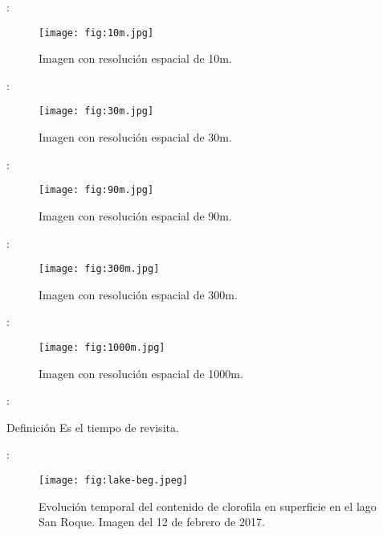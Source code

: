 \begin{frame}{\secname : \subsecname}
    \begin{figure}[h!]
        \centering
        \texttt{[image: fig:10m.jpg]}
        \caption{Imagen con resolución espacial de 10m.}
    \end{figure}
\end{frame}

\begin{frame}{\secname : \subsecname}
    \begin{figure}[h!]
        \centering
        \texttt{[image: fig:30m.jpg]}
        \caption{Imagen con resolución espacial de 30m.}
    \end{figure}
\end{frame}

\begin{frame}{\secname : \subsecname}
    \begin{figure}[h!]
        \centering
        \texttt{[image: fig:90m.jpg]}
        \caption{Imagen con resolución espacial de 90m.}
    \end{figure}
\end{frame}

\begin{frame}{\secname : \subsecname}
    \begin{figure}[h!]
        \centering
        \texttt{[image: fig:300m.jpg]}
        \caption{Imagen con resolución espacial de 300m.}
    \end{figure}
\end{frame}

\begin{frame}{\secname : \subsecname}
    \begin{figure}[h!]
        \centering
        \texttt{[image: fig:1000m.jpg]}
        \caption{Imagen con resolución espacial de 1000m.}
    \end{figure}
\end{frame}


\begin{frame}{\secname : \subsecname}
    \begin{block}{Definición}
        Es el tiempo de revisita.
    \end{block}
\end{frame}

\begin{frame}{\secname : \subsecname}
    \begin{figure}[h!]
        \centering
        \texttt{[image: fig:lake-beg.jpeg]}
        \caption{Evolución temporal del contenido de clorofila en superficie en el lago San Roque. Imagen del 12 de febrero de 2017.}
        \label{fig:lake-beg}
    \end{figure}
\end{frame}

